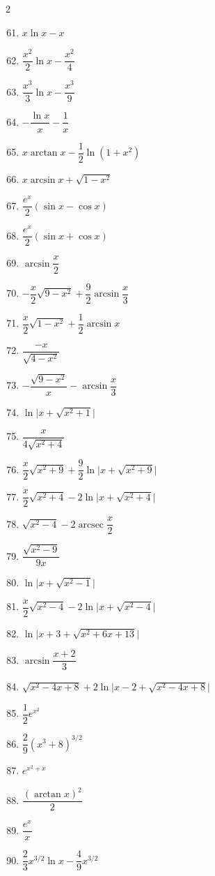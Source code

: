 \documentclass[12pt, letterpaper]{article}
\begin{document}
\begin{multicols}{2}
\begin{enumerate}[label=\textbf{\arabic*.}, leftmargin=*, itemsep=6pt]
  \setcounter{enumi}{60}
  \item $x\ln x - x$
  \item $\dfrac{x^2}{2}\ln x - \dfrac{x^2}{4}$
  \item $\dfrac{x^3}{3}\ln x - \dfrac{x^3}{9}$
  \item $-\dfrac{\ln x}{x}-\dfrac{1}{x}$
  \setcounter{enumi}{67}
  \item $x\arctan x - \dfrac{1}{2}\ln(1+x^2)$
  \item $x\arcsin x + \sqrt{1-x^2}$

  \setcounter{enumi}{73}
  \item $\dfrac{e^x}{2}(\sin x - \cos x)$
  \item $\dfrac{e^x}{2}(\sin x + \cos x)$

  \setcounter{enumi}{83}
  \item $\arcsin\dfrac{x}{2}$
  \item $-\dfrac{x}{2}\sqrt{9-x^2}+\dfrac{9}{2}\arcsin\dfrac{x}{3}$
  \item $\dfrac{x}{2}\sqrt{1-x^2}+\dfrac{1}{2}\arcsin x$
  \item $\dfrac{-x}{\sqrt{4-x^2}}$
  \item $-\dfrac{\sqrt{9-x^2}}{x}-\arcsin\dfrac{x}{3}$
  \setcounter{enumi}{88}
  \item $\ln\bigl|x+\sqrt{x^2+1}\bigr|$
  \item $\dfrac{x}{4\sqrt{x^2+4}}$
  \item $\dfrac{x}{2}\sqrt{x^2+9}+\dfrac{9}{2}\ln\bigl|x+\sqrt{x^2+9}\bigr|$
  \item $\dfrac{x}{2}\sqrt{x^2+4}-2\ln\bigl|x+\sqrt{x^2+4}\bigr|$
  \setcounter{enumi}{93}
  \item $\sqrt{x^2-4}-2\operatorname{arcsec}\dfrac{x}{2}$
  \item $\dfrac{\sqrt{x^2-9}}{9x}$
  \item $\ln\bigl|x+\sqrt{x^2-1}\bigr|$
  \item $\dfrac{x}{2}\sqrt{x^2-4}-2\ln\bigl|x+\sqrt{x^2-4}\bigr|$
  \setcounter{enumi}{97}
  \item $\ln\bigl|x+3+\sqrt{x^2+6x+13}\bigr|$
  \item $\arcsin\dfrac{x+2}{3}$
  \item $\sqrt{x^2-4x+8}+2\ln\bigl|x-2+\sqrt{x^2-4x+8}\bigr|$

  \setcounter{enumi}{100}
  \item $\dfrac{1}{2}e^{x^2}$
  \item $\dfrac{2}{9}(x^3+8)^{3/2}$
  \item $e^{x^2+x}$
  \item $\dfrac{(\arctan x)^2}{2}$
  \setcounter{enumi}{109}
  \item $\dfrac{e^x}{x}$
  \item $\dfrac{2}{3}x^{3/2}\ln x - \dfrac{4}{9}x^{3/2}$

\end{enumerate}
\end{multicols}
\end{document}
